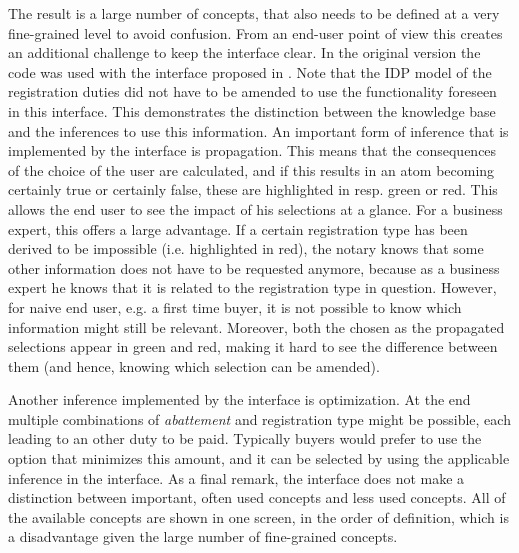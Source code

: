 The result is a large number of concepts, that also needs to be defined at a very fine-grained level to avoid confusion.
From an end-user point of view this creates an additional challenge to keep the interface clear.
In the original version the code was used with the interface proposed in \cite{Ingmar}.
Note that the IDP model of the registration duties did not have to be amended to use the functionality foreseen in this interface.
This demonstrates the distinction between the knowledge base and the inferences to use this information.
An important form of inference that is implemented by the interface is propagation.
This means that the consequences of the choice of the user are calculated, and if this results in an atom becoming certainly true or certainly false, these are highlighted in resp. green or red.%
This allows the end user to see the impact of his selections at a glance.
For a business expert, this offers a large advantage.
If a certain registration type has been derived to be impossible (i.e. highlighted in red), the notary knows that some other information does not have to be requested anymore, because as a business expert he knows that it is related to the registration type in question.
However, for naive end user, e.g. a first time buyer, it is not possible to know which information might still be relevant.
Moreover, both the chosen as the propagated selections appear in green and red, making it hard to see the difference between them (and hence, knowing which selection can be amended).

Another inference implemented by the interface is optimization. 
At the end multiple combinations of \textit{abattement} and registration type might be possible, each leading to an other duty to be paid.
Typically buyers would prefer to use the option that minimizes this amount, and it can be selected by using the applicable inference in the interface.
As a final remark, the interface does not make a distinction between important, often used concepts and less used concepts.
All of the available concepts are shown in one screen, in the order of definition, which is a disadvantage given the large number of fine-grained concepts.



